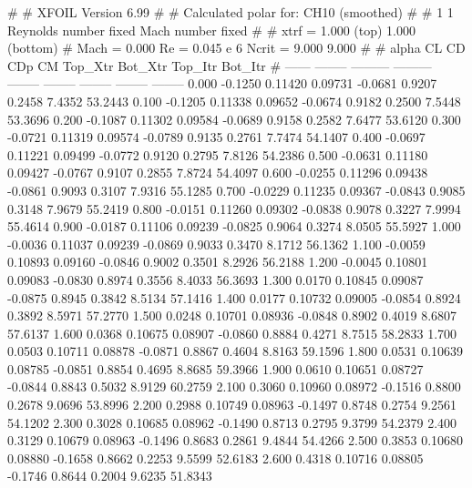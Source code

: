 #  
#       XFOIL         Version 6.99
#  
# Calculated polar for: CH10 (smoothed)                                 
#  
# 1 1 Reynolds number fixed          Mach number fixed         
#  
# xtrf =   1.000 (top)        1.000 (bottom)  
# Mach =   0.000     Re =     0.045 e 6     Ncrit =   9.000  9.000
#  
#   alpha    CL        CD       CDp       CM     Top_Xtr  Bot_Xtr  Top_Itr  Bot_Itr
#  ------ -------- --------- --------- -------- -------- -------- -------- --------
   0.000  -0.1250   0.11420   0.09731  -0.0681   0.9207   0.2458   7.4352  53.2443
   0.100  -0.1205   0.11338   0.09652  -0.0674   0.9182   0.2500   7.5448  53.3696
   0.200  -0.1087   0.11302   0.09584  -0.0689   0.9158   0.2582   7.6477  53.6120
   0.300  -0.0721   0.11319   0.09574  -0.0789   0.9135   0.2761   7.7474  54.1407
   0.400  -0.0697   0.11221   0.09499  -0.0772   0.9120   0.2795   7.8126  54.2386
   0.500  -0.0631   0.11180   0.09427  -0.0767   0.9107   0.2855   7.8724  54.4097
   0.600  -0.0255   0.11296   0.09438  -0.0861   0.9093   0.3107   7.9316  55.1285
   0.700  -0.0229   0.11235   0.09367  -0.0843   0.9085   0.3148   7.9679  55.2419
   0.800  -0.0151   0.11260   0.09302  -0.0838   0.9078   0.3227   7.9994  55.4614
   0.900  -0.0187   0.11106   0.09239  -0.0825   0.9064   0.3274   8.0505  55.5927
   1.000  -0.0036   0.11037   0.09239  -0.0869   0.9033   0.3470   8.1712  56.1362
   1.100  -0.0059   0.10893   0.09160  -0.0846   0.9002   0.3501   8.2926  56.2188
   1.200  -0.0045   0.10801   0.09083  -0.0830   0.8974   0.3556   8.4033  56.3693
   1.300   0.0170   0.10845   0.09087  -0.0875   0.8945   0.3842   8.5134  57.1416
   1.400   0.0177   0.10732   0.09005  -0.0854   0.8924   0.3892   8.5971  57.2770
   1.500   0.0248   0.10701   0.08936  -0.0848   0.8902   0.4019   8.6807  57.6137
   1.600   0.0368   0.10675   0.08907  -0.0860   0.8884   0.4271   8.7515  58.2833
   1.700   0.0503   0.10711   0.08878  -0.0871   0.8867   0.4604   8.8163  59.1596
   1.800   0.0531   0.10639   0.08785  -0.0851   0.8854   0.4695   8.8685  59.3966
   1.900   0.0610   0.10651   0.08727  -0.0844   0.8843   0.5032   8.9129  60.2759
   2.100   0.3060   0.10960   0.08972  -0.1516   0.8800   0.2678   9.0696  53.8996
   2.200   0.2988   0.10749   0.08963  -0.1497   0.8748   0.2754   9.2561  54.1202
   2.300   0.3028   0.10685   0.08962  -0.1490   0.8713   0.2795   9.3799  54.2379
   2.400   0.3129   0.10679   0.08963  -0.1496   0.8683   0.2861   9.4844  54.4266
   2.500   0.3853   0.10680   0.08880  -0.1658   0.8662   0.2253   9.5599  52.6183
   2.600   0.4318   0.10716   0.08805  -0.1746   0.8644   0.2004   9.6235  51.8343
